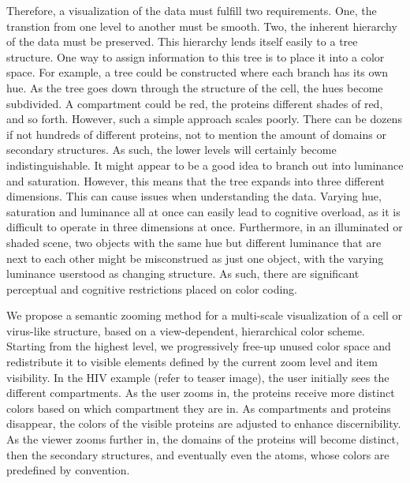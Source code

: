 \documentclass[review,journal]{vgtc}         %
\begin{document}
Therefore, a visualization of the data must fulfill two requirements. 
One, the transtion from one level to another must be smooth.
Two, the inherent hierarchy of the data must be preserved.
This hierarchy lends itself easily to a tree structure.
One way to assign information to this tree is to place it into a color space.
For example, a tree could be constructed where each branch has its own hue.
As the tree goes down through the structure of the cell, the hues become subdivided.
A compartment could be red, the proteins different shades of red, and so forth.
However, such a simple approach scales poorly. 
There can be dozens if not hundreds of different proteins, not to mention the amount of domains or secondary structures.
As such, the lower levels will certainly become indistinguishable.
It might appear to be a good idea to branch out into luminance and saturation.
However, this means that the tree expands into three different dimensions.
This can cause issues when understanding the data.
Varying hue, saturation and luminance all at once can easily lead to cognitive overload, as it is difficult to operate in three dimensions at once. 
Furthermore, in an illuminated or shaded scene, two objects with the same hue but different luminance that are next to each other might be misconstrued as just one object, with the varying luminance userstood as changing structure. 
As such, there are significant perceptual and cognitive restrictions placed on color coding. 

We propose a semantic zooming method for a multi-scale visualization of a cell or virus-like structure, based on a view-dependent, hierarchical color scheme.
Starting from the highest level, we progressively free-up unused color space and redistribute it to visible elements defined by the current zoom level and item visibility.
In the HIV example (refer to teaser image), the user initially sees the different compartments. 
As the user zooms in, the proteins receive more distinct colors based on which compartment they are in. 
As compartments and proteins disappear, the colors of the visible proteins are adjusted to enhance discernibility.  
As the viewer zooms further in, the domains of the proteins will become distinct, then the secondary structures, and eventually even the atoms, whose colors are predefined by convention. 
\end{document}
